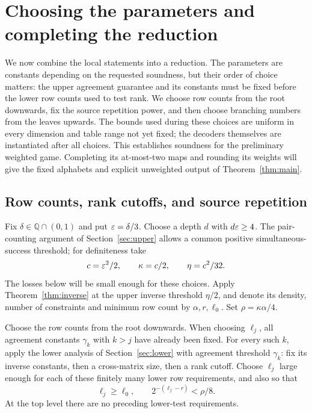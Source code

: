 \section{Choosing the parameters and completing the reduction}
\label{sec:assembly}

We now combine the local statements into a reduction.
The parameters are constants depending on the requested soundness, but their
order of choice matters: the upper agreement guarantee and its constants
must be fixed before the lower row counts used to test rank.  We choose row
counts from the root downwards, fix the source repetition
power, and then choose branching numbers from the leaves upwards.  The
bounds used during these choices are uniform in every dimension and table
range not yet fixed; the decoders themselves are instantiated after all
choices.  This establishes soundness for the preliminary weighted game.
Completing its at-most-two maps and rounding its weights will give the fixed alphabets and explicit
unweighted output of Theorem~\ref{thm:main}.

\subsection{Row counts, rank cutoffs, and source repetition}

Fix $\delta\in\mathbb Q\cap(0,1)$ and put $\varepsilon=\delta/3$.
Choose a depth $d$ with $d\varepsilon\ge4$.
The pair-counting argument of Section~\ref{sec:upper} allows a common positive
simultaneous-success threshold; for definiteness take
\[
 c=\varepsilon^2/2,\qquad \kappa=c/2,\qquad
 \eta=c^2/32.
\]
The losses below will be small enough for these choices.
Apply Theorem~\ref{thm:inverse} at the upper inverse threshold $\eta/2$,
and denote its density, number of constraints and minimum row count by
$\alpha,r,\ell_0$.
Set $\rho=\kappa\alpha/4$.

Choose the row counts from the root downwards.
When choosing $\ell_j$, all agreement constants $\gamma_k$ with $k>j$ have
already been fixed. For every such $k$, apply the lower analysis of
Section~\ref{sec:lower} with agreement threshold $\gamma_k$:
fix its inverse constants, then a cross-matrix size, then a rank cutoff.
Choose $\ell_j$ large enough for each of these finitely many lower row
requirements, and also so that
\begin{equation}\label{eq:upper-row-choice}
       \ell_j\ge\ell_0,\qquad
       2^{-(\ell_j-r)}<\rho/8.
\end{equation}
At the top level there are no preceding lower-test requirements.

